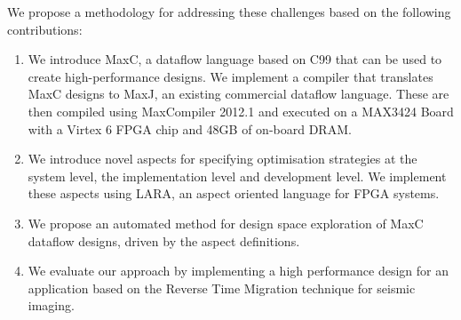 We propose a methodology for addressing these challenges based on the
following contributions:
\begin{enumerate}
\item We introduce MaxC, a dataflow language based on C99 that can be
  used to create high-performance designs. We implement a compiler
  that translates MaxC designs to MaxJ, an existing commercial dataflow
  language. These are then compiled using MaxCompiler 2012.1 and
  executed on a MAX3424 Board with a Virtex 6 FPGA chip and 48GB of
  on-board DRAM.
\item We introduce novel aspects for specifying optimisation
  strategies at the system level, the implementation level and
  development level. We implement these aspects using LARA, an aspect
  oriented language for FPGA systems.
\item We propose an automated method for design space exploration of
  MaxC dataflow designs, driven by the aspect definitions.
\item We evaluate our approach by implementing a high performance
  design for an application based on the Reverse Time Migration
  technique for seismic imaging.
\end{enumerate}
